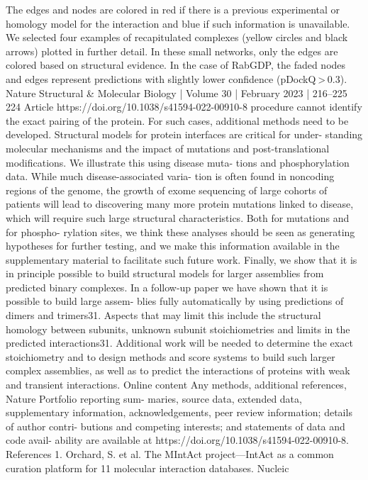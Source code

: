 The edges and nodes are colored in red if there is a previous experimental or
homology model for the interaction and blue if such information is unavailable.
We selected four examples of recapitulated complexes (yellow circles and black
arrows) plotted in further detail. In these small networks, only the edges are
colored based on structural evidence. In the case of RabGDP, the faded nodes and
edges represent predictions with slightly lower confidence (pDockQ > 0.3).
Nature Structural \& Molecular Biology | Volume 30 | February 2023 | 216–225
224
Article
https://doi.org/10.1038/s41594-022-00910-8
procedure cannot identify the exact pairing of the protein. For such
cases, additional methods need to be developed.
Structural models for protein interfaces are critical for under-
standing molecular mechanisms and the impact of mutations and
post-translational modifications. We illustrate this using disease muta-
tions and phosphorylation data. While much disease-associated varia-
tion is often found in noncoding regions of the genome, the growth of
exome sequencing of large cohorts of patients will lead to discovering
many more protein mutations linked to disease, which will require such
large structural characteristics. Both for mutations and for phospho-
rylation sites, we think these analyses should be seen as generating
hypotheses for further testing, and we make this information available
in the supplementary material to facilitate such future work.
Finally, we show that it is in principle possible to build structural
models for larger assemblies from predicted binary complexes. In a
follow-up paper we have shown that it is possible to build large assem-
blies fully automatically by using predictions of dimers and trimers31.
Aspects that may limit this include the structural homology between
subunits, unknown subunit stoichiometries and limits in the predicted
interactions31. Additional work will be needed to determine the exact
stoichiometry and to design methods and score systems to build such
larger complex assemblies, as well as to predict the interactions of
proteins with weak and transient interactions.
Online content
Any methods, additional references, Nature Portfolio reporting sum-
maries, source data, extended data, supplementary information,
acknowledgements, peer review information; details of author contri-
butions and competing interests; and statements of data and code avail-
ability are available at https://doi.org/10.1038/s41594-022-00910-8.
References
1.
Orchard, S. et al. The MIntAct project—IntAct as a common
curation platform for 11 molecular interaction databases. Nucleic
